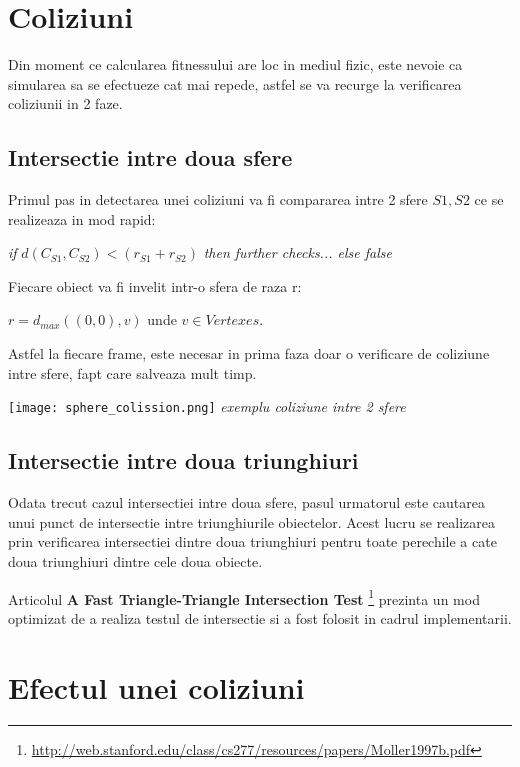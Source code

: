 \section{Coliziuni}

Din moment ce calcularea fitnessului are loc in mediul fizic, este nevoie ca simularea sa se efectueze cat mai repede, astfel se va recurge la verificarea coliziunii in 2 faze.
\subsection{Intersectie intre doua sfere}
Primul pas in detectarea unei coliziuni va fi compararea intre 2 sfere $S1,S2$ ce se realizeaza in mod rapid:

\begin{center}
\textit{if} $d(C_{S1},C_{S2}) < (r_{S1}+r_{S2})$ \textit{then further checks... else false}
\end{center}

Fiecare obiect va fi invelit intr-o sfera de raza r:
\begin{center}
$r = d_{max}((0,0),v)$ unde $v \in Vertexes$. 
\end{center}

Astfel la fiecare frame, este necesar in prima faza doar o verificare de coliziune intre sfere, fapt care salveaza mult timp.

\begin{center}
    \texttt{[image: sphere\_colission.png]} \linebreak
    \textit{exemplu coliziune intre 2 sfere}
\end{center}

\subsection{Intersectie intre doua triunghiuri}
Odata trecut cazul intersectiei intre doua sfere, pasul urmatorul este cautarea unui punct de intersectie intre triunghiurile obiectelor. Acest lucru se realizarea prin verificarea intersectiei dintre doua triunghiuri pentru toate perechile a cate doua triunghiuri dintre cele doua obiecte.

Articolul \textbf{A Fast Triangle-Triangle Intersection Test} \footnote{\url{http://web.stanford.edu/class/cs277/resources/papers/Moller1997b.pdf}} prezinta un mod optimizat de a realiza testul de intersectie si a fost folosit in cadrul implementarii.

\section{Efectul unei coliziuni}

